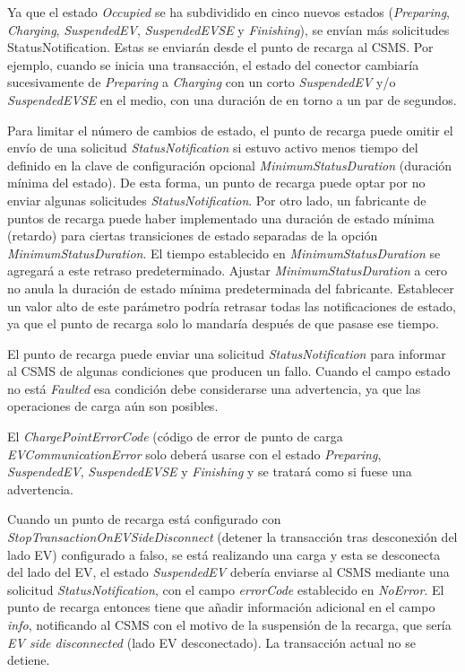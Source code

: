 \documentclass[12pt,a4paper,onecolumn,oneside]{report}
\begin{document}
Ya que el estado \textit{Occupied} se ha subdividido en cinco nuevos estados (\textit{Preparing}, \textit{Charging}, \textit{SuspendedEV}, \textit{SuspendedEVSE} y \textit{Finishing}), se envían más solicitudes StatusNotification. Estas se enviarán desde el punto de recarga al CSMS. Por ejemplo, cuando se inicia una transacción, el estado del conector cambiaría sucesivamente de \textit{Preparing} a \textit{Charging} con un corto \textit{SuspendedEV} y/o \textit{SuspendedEVSE} en el medio, con una duración de en torno a un par de segundos.

Para limitar el número de cambios de estado, el punto de recarga puede omitir el envío de una solicitud \textit{StatusNotification} si estuvo activo menos tiempo del definido en la clave de configuración opcional \textit{MinimumStatusDuration} (duración mínima del estado). De esta forma, un punto de recarga puede optar por no enviar algunas solicitudes \textit{StatusNotification}. Por otro lado, un fabricante de puntos de recarga puede haber implementado una duración de estado mínima (retardo) para ciertas transiciones de estado separadas de la opción \textit{MinimumStatusDuration}. El tiempo establecido en \textit{MinimumStatusDuration} se agregará a este retraso predeterminado. Ajustar \textit{MinimumStatusDuration} a cero no anula la duración de estado mínima predeterminada del fabricante. Establecer un valor alto de este parámetro podría retrasar todas las notificaciones de estado, ya que el punto de recarga solo lo mandaría después de que pasase ese tiempo.

El punto de recarga puede enviar una solicitud \textit{StatusNotification} para informar al CSMS de algunas condiciones que producen un fallo. Cuando el campo estado no está \textit{Faulted} esa condición debe considerarse una advertencia, ya que las operaciones de carga aún son posibles.

El \textit{ChargePointErrorCode} (código de error de punto de carga \textit{EVCommunicationError} solo deberá usarse con el estado \textit{Preparing}, \textit{SuspendedEV}, \textit{SuspendedEVSE} y \textit{Finishing} y se tratará como si fuese una advertencia.

Cuando un punto de recarga está configurado con \textit{StopTransactionOnEVSideDisconnect} (detener la transacción tras desconexión del lado EV) configurado a falso, se está realizando una carga y esta se desconecta del lado del EV, el estado \textit{SuspendedEV} debería enviarse al CSMS mediante una solicitud \textit{StatusNotification}, con el campo \textit{errorCode} establecido en \textit{NoError}. El punto de recarga entonces tiene que añadir información adicional en el campo \textit{info}, notificando al CSMS con el motivo de la suspensión de la recarga, que sería \textit{EV side disconnected} (lado EV desconectado). La transacción actual no se detiene.
\end{document}
